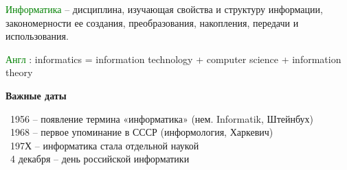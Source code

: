 \rhead{\textbf{\textcolor{blue}{Т}\textcolor{gray}{ерминология: Информация и данные}}}
\vskip 1cm

\textcolor{Green}{Информатика}
– дисциплина, изучающая свойства и структуру информации,
закономерности ее создания, преобразования, накопления, передачи и
использования.

\vspace*{3mm}
\textcolor{Green}{Англ}
: informatics = information technology + computer science + information
theory

\vspace*{3mm}
\begin{center}
  \textbf{Важные даты}
\end{center}

			\textbullet \ 1956 – появление термина «информатика» (нем. Informatik, Штейнбух) \\
			\textbullet \ 1968 – первое упоминание в СССР (информология, Харкевич) \\
			\textbullet \ 197Х – информатика стала отдельной наукой \\
			\textbullet \ 4 декабря – день российской информатики

